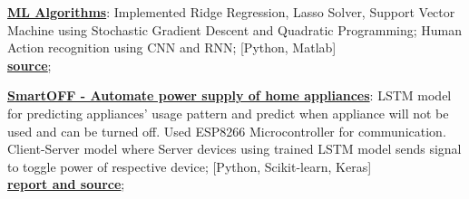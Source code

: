 \documentclass[letterpaper,11pt]{article}
\newcommand{\resumeItem}[2]{
  \item\small{
    \textbf{#1}{: #2 \vspace{-2pt}}
  }
}
\newcommand{\resumeSubItem}[2]{\resumeItem{#1}{#2}\vspace{-1pt}}
\begin{document}
    \resumeSubItem{\href{https://github.com/bhushan23/SBU-ML-Assignment}{ML Algorithms}}{Implemented Ridge Regression, Lasso Solver, Support Vector Machine using Stochastic Gradient Descent and Quadratic Programming; Human Action recognition using CNN and RNN; [Python, Matlab] \\\href{https://github.com/bhushan23/SBU-ML-Assignment}{\textbf{\underline{source}}};}
    \resumeSubItem{\href{https://github.com/bhushan23/SmartOff}{SmartOFF - Automate power supply of home appliances}} {LSTM model for predicting appliances' usage pattern and predict when appliance will not be used and can be turned off. Used ESP8266 Microcontroller for communication. Client-Server model where Server devices using trained LSTM model sends signal to toggle power of respective device; [Python, Scikit-learn, Keras] \\\href{https://github.com/bhushan23/SmartOff}{ \textbf{\underline{report and source}}};}
\end{document}
